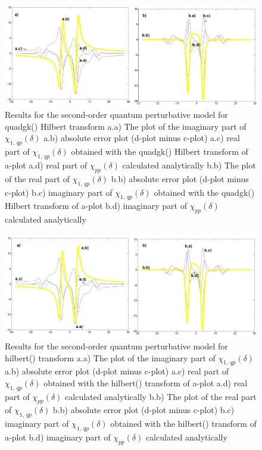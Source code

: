 \documentclass[12pt,twoside,a4paper]{article}
\numberwithin{equation}{subsection}
\numberwithin{figure}{subsection}
\begin{document}
\begin{figure}
  \includegraphics[width=150mm]{img/quadgk_qp2.png}
  \caption{Results for the second-order quantum perturbative model for quadgk() Hilbert transform
    a.a) The plot of the imaginary part of ${\chi_{1, \,qp}}(\delta )$
    a.b) absolute error plot (d-plot minus c-plot) 
    a.c) real part of ${\chi_{1, \,qp}}(\delta )$ obtained with the quadgk() Hilbert transform of a-plot 
    a.d) real part of ${\chi_{pp}}(\delta )$ calculated analytically 
    b.b) The plot of the real part of ${\chi_{1, \,qp}}(\delta )$ 
    b.b) absolute error plot (d-plot minus c-plot) 
    b.c) imaginary part of ${\chi_{1, \,qp}}(\delta )$ obtained with the quadgk()  Hilbert transform of a-plot 
    b.d) imaginary part of ${\chi_{pp}}(\delta )$ calculated analytically  
    \label{fig:quadgk_qp2}
  }
\end{figure}

\begin{figure}
  \includegraphics[width=150mm]{img/hilb_qp2.png}
  \caption{Results for the second-order quantum perturbative model for hilbert() transform
    a.a) The plot of the imaginary part of ${\chi_{1, \,qp}}(\delta )$
    a.b) absolute error plot (d-plot minus c-plot) 
    a.c) real part of ${\chi_{1, \,qp}}(\delta )$ obtained with the hilbert() transform of a-plot 
    a.d) real part of ${\chi_{pp}}(\delta )$ calculated analytically 
    b.b) The plot of the real part of ${\chi_{1, \,qp}}(\delta )$ 
    b.b) absolute error plot (d-plot minus c-plot) 
    b.c) imaginary part of ${\chi_{1, \,qp}}(\delta )$ obtained with the hilbert() transform of a-plot 
    b.d) imaginary part of ${\chi_{pp}}(\delta )$ calculated analytically  
    \label{fig:hilb_qp2}
  }
\end{figure}
\end{document}
